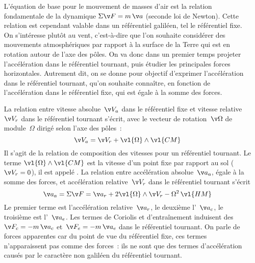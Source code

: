 \sk
L'équation de base pour le mouvement de masses d'air est la relation fondamentale de la dynamique $\Sigma \v F=m \, \v a$ (seconde loi de Newton).  Cette relation est cependant valable dans un référentiel galiléen, tel le référentiel fixe. On s'intéresse plutôt au vent, c'est-à-dire que l'on souhaite considérer des mouvements atmosphériques par rapport à la surface de la Terre qui est en rotation autour de l'axe des pôles. On va donc dans un premier temps projeter l'accélération dans le référentiel tournant, puis étudier les principales forces horizontales. Autrement dit, on se donne pour objectif d'exprimer l'accélération dans le référentiel tournant, qu'on souhaite connaître, en fonction de l'accélération dans le référentiel fixe, qui est égale à la somme des forces.

\sk
La relation entre vitesse absolue~$\v V_a$ dans le référentiel fixe et vitesse relative~$\v V_r$ dans le référentiel tournant s'écrit, avec le vecteur de rotation~$\v \Omega$ de module~$\Omega$ dirigé selon l'axe des pôles~:
\[\v V_a = \v V_r + \vl{\Omega}\wedge\vl{CM}\]
Il s'agit de la relation de composition des vitesses pour un référentiel tournant. Le terme $\vl{\Omega}\wedge\vl{CM}$ est la vitesse d'un point fixe par rapport au sol ($\v V_r=0$), il est appelé .
La relation entre accélération absolue~$\v a_a$, égale à la somme des forces, et accélération relative~$\v V_r$ dans le référentiel tournant s'écrit
\[ \v a_a=\Sigma\v F=\v a_r+2\vl{\Omega}\wedge\v V_r-\Omega^2\,\vl{HM} \]
Le premier terme est l'accélération relative~$\v a_r$, le deuxième l'~$\v a_c$, le troisième est l'~$\v a_e$. Les termes de Coriolis et d'entraînement induisent des ~$\v F_c = -m \, \v a_c$ et~$\v F_e = -m \, \v a_e$ dans le référentiel tournant. On parle de forces apparentes car du point de vue du référentiel fixe, ces termes n'apparaissent pas comme des forces~: ils ne sont que des termes d'accélération causés par le caractère non galiléen du référentiel tournant.


